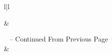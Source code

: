             \begin{longtable}{l|l}
            \caption{Unigram Chilean Cities, Excluded and Included in Step 3 of Applied Methodology} \label{app:tab_unis}
            
            \hline\hline {} &  \\ \hline 
            \endfirsthead
            
            {{\tablename\ \thetable{} -- Continued From Previous Page}} \\
            \hline {} &   \\ \hline 
            \endhead
            
            \hline {} 
            \endfoot
            
            \hline \hline
            \endlastfoot
            

\end{longtable}

